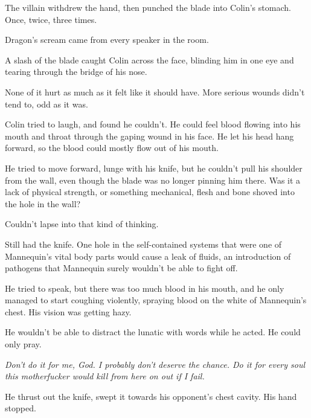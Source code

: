 The villain withdrew the hand, then punched the blade into Colin's stomach.  Once, twice, three times.



Dragon's scream came from every speaker in the room.



A slash of the blade caught Colin across the face, blinding him in one eye and tearing through the bridge of his nose.



None of it hurt as much as it felt like it should have.  More serious wounds didn't tend to, odd as it was.



Colin tried to laugh, and found he couldn't.  He could feel blood flowing into his mouth and throat through the gaping wound in his face.  He let his head hang forward, so the blood could mostly flow out of his mouth.



He tried to move forward, lunge with his knife, but he couldn't pull his shoulder from the wall, even though the blade was no longer pinning him there.  Was it a lack of physical strength, or something mechanical, flesh and bone shoved into the hole in the wall?



Couldn't lapse into that kind of thinking.



Still had the knife.  One hole in the self-contained systems that were one of Mannequin's vital body parts would cause a leak of fluids, an introduction of pathogens that Mannequin surely wouldn't be able to fight off.



He tried to speak, but there was too much blood in his mouth, and he only managed to start coughing violently, spraying blood on the white of Mannequin's chest.  His vision was getting hazy.



He wouldn't be able to distract the lunatic with words while he acted.  He could only pray.



\emph{Don't do it for me, God.  I probably don't deserve the chance.  Do it for every soul this motherfucker would kill from here on out if I fail.}



He thrust out the knife, swept it towards his opponent's chest cavity.  His hand stopped.



